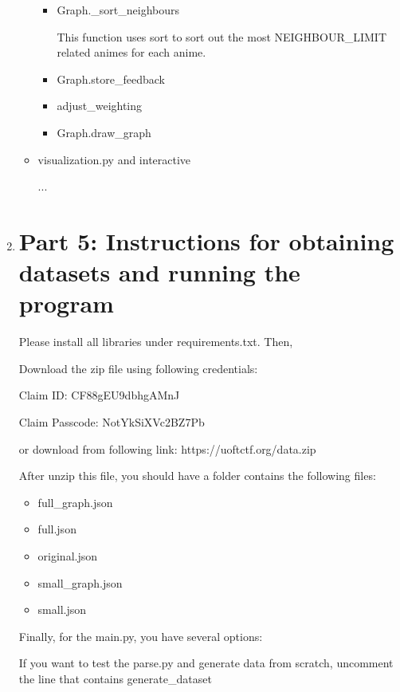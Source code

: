 \documentclass[12pt]{article}
\begin{document}
\begin{enumerate}
\begin{text}
\begin{itemize}
\begin{itemize}
        \item Graph.\_sort\_neighbours
        
            This function uses sort to sort out the most NEIGHBOUR\_LIMIT related animes for each anime.
            
        \item Graph.store\_feedback
        
        \item adjust\_weighting
        
        \item Graph.draw\_graph
    \end{itemize}
    

    \item visualization.py and interactive
    
    ...
\end{itemize}

\end{text}

\newpage

\item \section*{Part 5: Instructions for obtaining datasets and running the program}

\begin{text}
Please install all libraries under requirements.txt. Then,

Download the zip file using following credentials:

Claim ID: CF88gEU9dbhgAMnJ

Claim Passcode: NotYkSiXVc2BZ7Pb

or download from following link: https://uoftctf.org/data.zip

After unzip this file, you should have a folder contains the following files:

\begin{itemize}
    \item full_graph.json
    \item full.json
    \item original.json
    \item small_graph.json
    \item small.json
\end{itemize}

Finally, for the main.py, you have several options: 

If you want to test the parse.py and generate data from scratch, uncomment the line that contains generate\_dataset


\end{text}
\end{enumerate}
\end{document}
